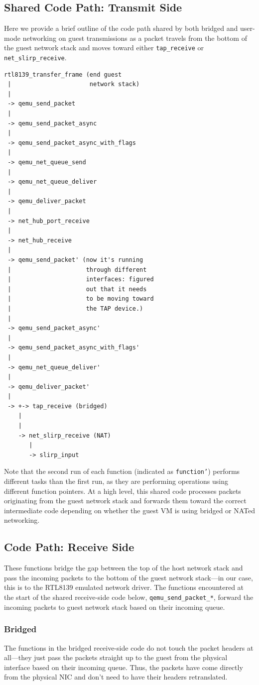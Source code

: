 \documentclass[letterpaper,twocolumn,11pt]{article}
\begin{document}
\subsection*{Shared Code Path: Transmit Side}
Here we provide a brief outline of the code path shared by both bridged and user-mode networking on guest transmissions as a packet travels from the bottom of the guest network stack and moves toward either \texttt{tap\_receive} or \texttt{net\_slirp\_receive}. 

\begin{verbatim}
rtl8139_transfer_frame (end guest 
 |                      network stack)
 |
 -> qemu_send_packet
 |
 -> qemu_send_packet_async
 |
 -> qemu_send_packet_async_with_flags
 |
 -> qemu_net_queue_send
 |
 -> qemu_net_queue_deliver
 |
 -> qemu_deliver_packet
 |
 -> net_hub_port_receive
 |
 -> net_hub_receive
 |
 -> qemu_send_packet' (now it's running 
 |                     through different 
 |                     interfaces: figured 
 |                     out that it needs  
 |                     to be moving toward 
 |                     the TAP device.)
 |
 -> qemu_send_packet_async'
 |
 -> qemu_send_packet_async_with_flags'
 |
 -> qemu_net_queue_deliver'
 |
 -> qemu_deliver_packet'
 |
 -> +-> tap_receive (bridged)
    |
    |
    -> net_slirp_receive (NAT)
       |
       -> slirp_input 
\end{verbatim}

Note that the second run of each function (indicated as \texttt{function'}) performs different tasks than the first run, as they are performing operations using different function pointers. At a high level, this shared code processes packets originating from the guest network stack and forwards them toward the correct intermediate code depending on whether the guest VM is using bridged or NATed networking.

\subsection*{Code Path: Receive Side}
These functions bridge the gap between the top of the host network stack and pass the incoming packets to the bottom of the guest network stack---in our case, this is to the RTL8139 emulated network driver. The functions encountered at the start of the shared receive-side code below, \texttt{qemu\_send\_packet\_*}, forward the incoming packets to guest network stack based on their incoming queue.

\subsubsection*{Bridged}
The functions in the bridged receive-side code do not touch the packet headers at all---they just pass the packets straight up to the guest from the physical interface based on their incoming queue. Thus, the packets have come directly from the physical NIC and don't need to have their headers retranslated.
\end{document}
